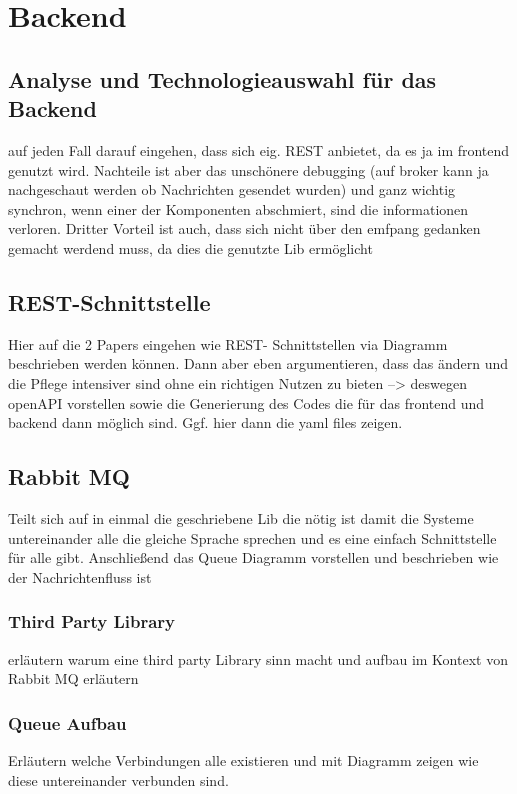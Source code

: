 \section{Backend}

\subsection{Analyse und Technologieauswahl für das Backend}
auf jeden Fall darauf eingehen, dass sich eig. REST anbietet, da es ja im frontend genutzt wird. Nachteile ist aber das unschönere debugging (auf broker kann ja nachgeschaut werden ob Nachrichten gesendet wurden) und ganz wichtig synchron, wenn einer der Komponenten abschmiert, sind die informationen verloren. Dritter Vorteil ist auch, dass sich nicht über den emfpang gedanken gemacht werdend muss, da dies die genutzte Lib ermöglicht


\subsection{REST-Schnittstelle}
Hier auf die 2  Papers eingehen wie REST- Schnittstellen via Diagramm beschrieben werden können. Dann aber eben argumentieren, dass das ändern und die Pflege intensiver sind ohne ein richtigen Nutzen zu bieten --> deswegen openAPI vorstellen sowie die Generierung des Codes die für das frontend und backend dann möglich sind. Ggf. hier dann die yaml files zeigen.

\subsection{Rabbit MQ}
Teilt sich auf in einmal die geschriebene Lib die nötig ist damit die Systeme untereinander alle die gleiche Sprache sprechen und es eine einfach Schnittstelle für alle gibt. Anschließend das Queue Diagramm vorstellen und beschrieben wie der Nachrichtenfluss ist

\subsubsection{Third Party Library}
erläutern warum eine third party Library sinn macht und aufbau im Kontext von Rabbit MQ erläutern

\subsubsection{Queue Aufbau}
Erläutern welche Verbindungen alle existieren und mit Diagramm zeigen wie diese untereinander verbunden sind.

